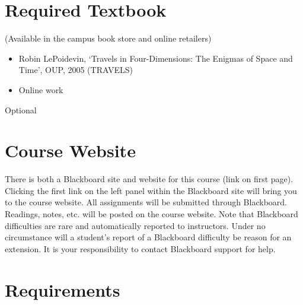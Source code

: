 \documentclass[article,oneside]{memoir}
\begin{document}
\section{Required Textbook}
(Available in the campus book store and online retailers)
\begin{itemize}
\item Robin LePoidevin, `Travels in Four-Dimensions: The Enigmas of Space and Time', OUP, 2005 (TRAVELS)
\item Online work
\end{itemize}
Optional

\section{Course Website}
There is both a Blackboard site and website for this course (link on first page). Clicking the first link on the left panel within the Blackboard site will bring you to the course website. All assignments will be submitted through Blackboard. Readings, notes, etc. will be posted on the course website. Note that Blackboard difficulties are rare and automatically reported to instructors. Under no circumstance will a student's report of a Blackboard difficulty be reason for an extension. It is your responsibility to contact Blackboard support for help.


\section{Requirements}
\end{document}
